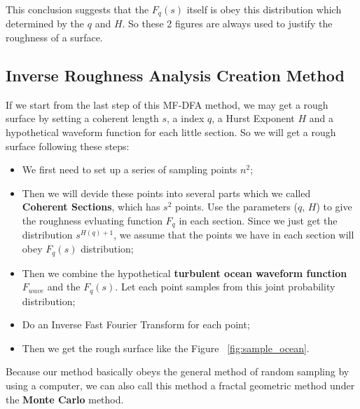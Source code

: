 \documentclass{mcmthesis}
\begin{document}
    This conclusion suggests that the $F_q(s)$ itself is obey this distribution which determined by the $q$ and $H$. So these 2 figures are always used to justify the roughness of a surface.

  \subsection{Inverse Roughness Analysis Creation Method}

    If we start from the last step of this MF-DFA method, we may get a rough surface by setting a coherent length $s$, a index $q$, a Hurst Exponent $H$ and a hypothetical waveform function for each little section. So we will get a rough surface following these steps:

      \begin{itemize}
        \item We first need to set up a series of sampling points $n^2$; \\
        \item Then we will devide these points into several parts which we called \textbf{Coherent Sections}, which has $s^2$ points. Use the parameters ($q$, $H$) to give the roughness evluating function $F_q$ in each section. Since we just get the distribution $s^{H(q) + 1}$, we assume that the points we have in each section will obey $F_q(s)$ distribution; \\
        \item Then we combine the hypothetical \textbf{turbulent ocean waveform function $F_{wave}$ } and the $F_q(s)$. Let each point samples from this joint probability distribution; \\
        \item Do an Inverse Fast Fourier Transform for each point;\\
        \item Then we get the rough surface like the Figure ~\ref{fig:sample_ocean}.
      \end{itemize}

    Because our method basically obeys the general method of random sampling by using a computer, we can also call this method a fractal geometric method under the \textbf{Monte Carlo} method.
\end{document}
